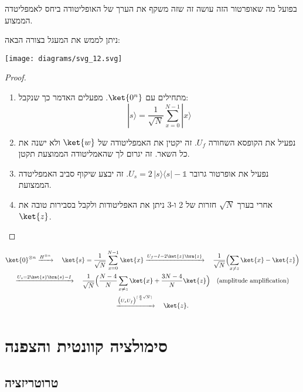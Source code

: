 \documentclass{tstextbook}
\begin{document}
\begin{remark}
בפועל מה שאופרטור הזה עושה זה שזה משקף את הערך של האופליטודה ביחס לאמפליטדה הממצוע.

\end{remark}
\begin{proposition}
ניתן לממש את המעגל בצורה הבאה:

\texttt{[image: diagrams/svg\_12.svg]}
\end{proposition}
\begin{proof}
  \begin{enumerate}
    \item מתחילים עם \(\ket{0^{n}}\). מפעלים האדמר כך שנקבל: 
$$|s\rangle={\frac{1}{\sqrt{N}}}\sum_{x=0}^{N-1}|x\rangle$$


    \item נפעיל את הקופסא השחורה \(U_{f}\). זה יקטין את האמפליטודה של \(\ket{w}\) ולא ישנה את כל השאר. זה יגרום לך שהאמליטודה הממוצעת תקטן. 


    \item נפעיל את אופרטור גרובר \(U_{s}=2\,|s\rangle\!\langle s|-\mathbb{1}\). זה יבצע שיקוף סביב האמפליטדה הממצועת.  


    \item אחרי בערך \(\sqrt{ N }\) חזרות של 2 ו-3 ניתן את האפליטודות ולקבל בסבירות טובה את \(\ket{z}\). 


  \end{enumerate}
\end{proof}
\begin{summary}
$$\begin{gather*}\ket{0}^{\otimes n} \xrightarrow{H^{\otimes n}} \quad \ket{s} = \frac{1}{\sqrt{N}}\sum_{x=0}^{N-1}\ket{x} \xrightarrow{U_f = I-2\ket{z}\bra{z}} \quad \frac{1}{\sqrt{N}}\Bigl(\sum_{x\neq z}\ket{x} - \ket{z}\Bigr) \\\xrightarrow{U_s = 2\ket{s}\bra{s}-I} \quad \frac{1}{\sqrt{N}}\Bigl(\frac{N-4}{N}\sum_{x\neq z}\ket{x} + \frac{3N-4}{N}\ket{z}\Bigr) \quad \text{(amplitude amplification)} \\\xrightarrow{\bigl(U_sU_f\bigr)^{\lceil \frac{\pi}{4}\sqrt{N}\rceil}} \quad \ket{z}.
\end{gather*}$$

\end{summary}
\chapter{סימולציה קוונטית והצפנה}

\section{טרוטריזציה}
\end{document}

